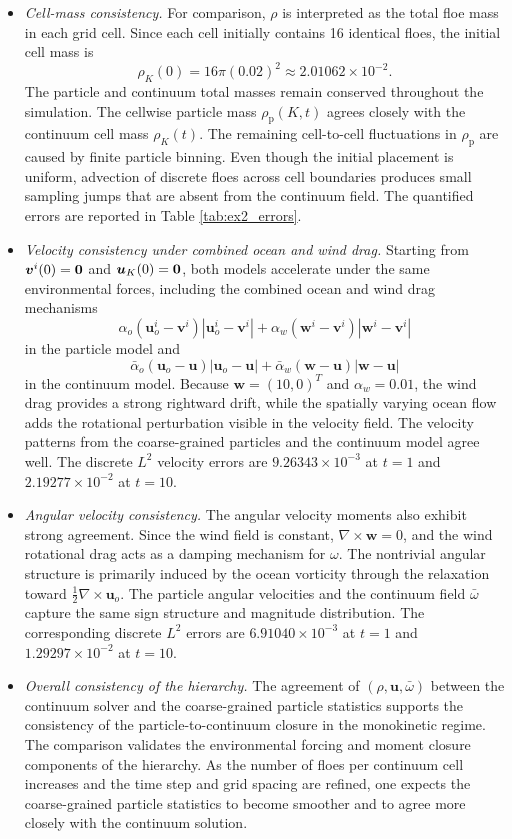 \documentclass[a4paper,11pt]{article}
\numberwithin{equation}{section}
\theoremstyle{definition}
\newcommand{\bfv}{\boldsymbol{v}}
\newcommand{\bfu}{\boldsymbol{u}_o}
\newcommand{\bfuu}{\boldsymbol{u}}
\newcommand{\bfw}{\boldsymbol{w}}
\begin{document}
\begin{itemize}
\item \textit{Cell-mass consistency.}
For comparison, $\rho$ is interpreted as the total floe mass in each
grid cell. Since each cell initially contains 16 identical floes, the initial
cell mass is
\[
\rho_K(0)=16\pi(0.02)^2 \approx 2.01062\times 10^{-2}.
\]
The particle and continuum total masses remain conserved throughout the
simulation.
The cellwise particle mass $\rho_{\mathrm{p}}(K,t)$ agrees closely with the
continuum cell mass $\rho_K(t)$. The remaining cell-to-cell fluctuations in
$\rho_{\mathrm{p}}$ are caused by finite particle binning. Even though the
initial placement is uniform, advection of discrete floes across cell
boundaries produces small sampling jumps that are absent from the continuum field. The quantified errors are reported in Table \ref{tab:ex2_errors}.

\item \textit{Velocity consistency under combined ocean and wind drag.}
Starting from $\bfv^i(0)=\bf0$ and $\bfuu_K(0)=\bf0$, both models accelerate
under the same environmental forces, including the combined ocean and wind drag mechanisms
\[
\alpha_o(\bfu^i-\bfv^i)|\bfu^i-\bfv^i|
+\alpha_w(\bfw^i-\bfv^i)|\bfw^i-\bfv^i|
\]
in the particle model and
\[
\bar\alpha_o(\bfu-\bfuu)|\bfu-\bfuu|
+\bar\alpha_w(\bfw-\bfuu)|\bfw-\bfuu|
\]
in the continuum model. Because $\bfw=(10,0)^T$ and $\alpha_w=0.01$, the wind
drag provides a strong rightward drift, while the spatially varying ocean flow
adds the rotational perturbation visible in the velocity field. The velocity
patterns from the coarse-grained particles and the continuum model agree well.
The discrete $L^2$ velocity errors are $9.26343\times 10^{-3}$ at $t=1$ and
$2.19277\times 10^{-2}$ at $t=10$.

\item \textit{Angular velocity consistency.}
The angular velocity moments also exhibit strong agreement. Since the wind
field is constant, $\nabla\times\bfw=0$, and the wind rotational drag acts as a
damping mechanism for $\omega$. The nontrivial angular structure is primarily
induced by the ocean vorticity through the relaxation toward
$\frac12\nabla\times\bfu$. The particle angular velocities and the continuum
field $\bar\omega$ capture the same sign structure and magnitude distribution.
The corresponding discrete $L^2$ errors are $6.91040\times 10^{-3}$ at $t=1$
and $1.29297\times 10^{-2}$ at $t=10$.

\item \textit{Overall consistency of the hierarchy.}
The agreement of $(\rho,\bfuu,\bar\omega)$ between the
continuum solver and the coarse-grained particle statistics supports the
consistency of the particle-to-continuum closure in the monokinetic regime.
The comparison validates the environmental forcing and moment closure components of the hierarchy. As the
number of floes per continuum cell increases and the time step and grid spacing
are refined, one expects the coarse-grained particle statistics to become
smoother and to agree more closely with the continuum solution.
\end{itemize}
\end{document}
